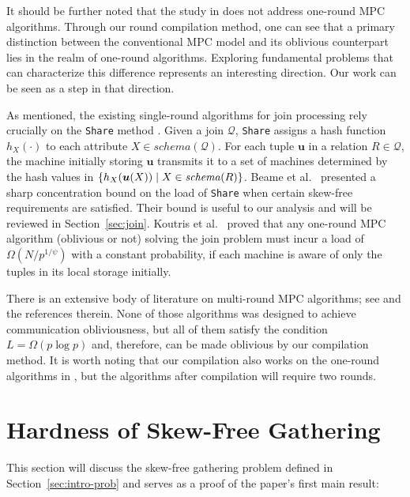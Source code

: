 \documentclass[sigconf]{acmart}
\def\vgap{\vspace{0mm}}
\def\Q{\mathcal{Q}}
\def\schema{\mathit{schema}}
\begin{document}
\vgap

It should be further noted that the study in \cite{ccls20} does not address one-round MPC algorithms. Through our round compilation method, one can see that a primary distinction between the conventional MPC model and its oblivious counterpart lies in the realm of one-round algorithms. Exploring fundamental problems that can characterize this difference represents an interesting direction. Our work can be seen as a step in that direction.

\vgap

As mentioned, the existing single-round algorithms for join processing \cite{assu13,au11,bks13,bks14,bks17c,kbs16} rely crucially on the \texttt{Share} method \cite{au11,bks17c}. Given a join $\Q$, \texttt{Share} assigns a hash function $h_X(\cdot)$ to each attribute $X \in \schema(\Q)$. For each tuple $\bm{u}$ in a relation $R \in \Q$, the machine initially storing $\bm{u}$ transmits it to a set of machines determined by the hash values in $\set{h_X(\bm{u}(X)) \mid X \in \schema(R)}$. Beame et al.\ \cite{bks17c} presented a sharp concentration bound on the load of \texttt{Share} when certain skew-free requirements are satisfied. Their bound is useful to our analysis and will be reviewed in Section~\ref{sec:join}. Koutris et al.\ \cite{kbs16} proved that any one-round MPC algorithm (oblivious or not) solving the join problem must incur a load of $\Omega(N/p^{1/\psi})$ with a constant probability, if each machine is aware of only the tuples in its local storage initially.


\vgap

There is an extensive body of literature on multi-round MPC algorithms; see \cite{ajr+17,aksu15,akz19,hyt19,kst22,hcww21,hk20,h21,hy19,qt21,t18b} and the references therein. None of those algorithms was designed to achieve communication obliviousness, but all of them satisfy the condition $L = \Omega(p \log p)$ and, therefore, can be made oblivious by our compilation method. It is worth noting that our compilation also works on the one-round algorithms in \cite{assu13,au11,bks13,bks14,bks17c,kbs16}, but the algorithms after compilation will require two rounds.

\section{Hardness of Skew-Free Gathering} \label{sec:gather}

This section will discuss the skew-free gathering problem defined in Section~\ref{sec:intro-prob} and serves as a proof of the paper's first main result:
\end{document}
